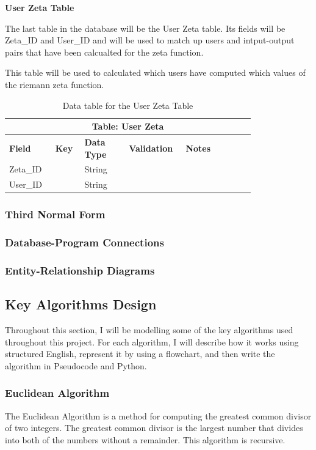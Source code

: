 \documentclass{article}
\begin{document}
\textbf{User Zeta Table}

The last table in the database will be the User Zeta table. Its fields will be Zeta\_ID and User\_ID and will be used to match up users and intput-output pairs that have been calcualted for the zeta function.

This table will be used to calculated which users have computed which values of the riemann zeta function.

\begin{table}[ht]
    \centering
    \begin{tabular}{ | p{0.15\linewidth} | p{0.1\linewidth} | p{0.16\linewidth} | p{0.14\linewidth} | p{0.25\linewidth} | }
    \hline
    \multicolumn{5}{|c|}{\textbf{Table: User Zeta}}\\
    \hline
    \hline
    \textbf{Field} & \textbf{Key} & \textbf{Data Type} & \textbf{Validation} & \textbf{Notes} \\
    \hline
    Zeta\_ID & & String & & \\
    \hline
    User\_ID & & String & & \\
    \hline
    \end{tabular}
    \caption{Data table for the User Zeta Table}
\end{table}

\subsubsection{Third Normal Form}
\subsubsection{Database-Program Connections}
\subsubsection{Entity-Relationship Diagrams}
\clearpage

\subsection{Key Algorithms Design}
Throughout this section, I will be modelling some of the key algorithms used throughout this project. For each algorithm, I will describe how it works using structured English, represent it by using a flowchart, and then write the algorithm in Pseudocode and Python.

\subsubsection{Euclidean Algorithm}
The Euclidean Algorithm is a method for computing the greatest common divisor of two integers. The greatest common divisor is the largest number that divides into both of the numbers without a remainder. This algorithm is recursive.
\end{document}
